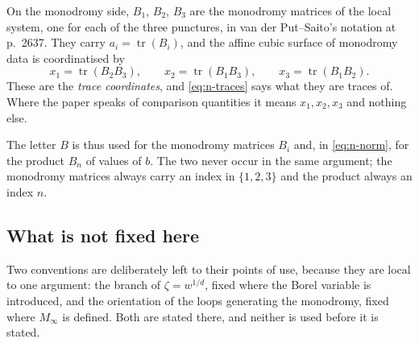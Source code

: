 On the monodromy side, $B_1$, $B_2$, $B_3$ are the monodromy matrices of the
local system, one for each of the three punctures, in van der Put--Saito's
notation at p.~2637. They carry $a_i=\operatorname{tr}(B_i)$, and the affine
cubic surface of monodromy data is coordinatised by
\begin{equation}\label{eq:n-traces}
  x_1=\operatorname{tr}(B_2B_3),\qquad
  x_2=\operatorname{tr}(B_1B_3),\qquad
  x_3=\operatorname{tr}(B_1B_2).
\end{equation}
These are the \emph{trace coordinates}, and \eqref{eq:n-traces} says what they
are traces of. Where the paper speaks of comparison quantities it means
$x_1,x_2,x_3$ and nothing else.

The letter $B$ is thus used for the monodromy matrices $B_i$ and, in
\eqref{eq:n-norm}, for the product $B_n$ of values of $b$. The two never occur
in the same argument; the monodromy matrices always carry an index in
$\{1,2,3\}$ and the product always an index $n$.

\subsection{What is not fixed here}\label{ssec:notfixed}

Two conventions are deliberately left to their points of use, because they are
local to one argument: the branch of $\zeta=w^{1/d}$, fixed where the Borel
variable is introduced, and the orientation of the loops generating the
monodromy, fixed where $M_\infty$ is defined. Both are stated there, and
neither is used before it is stated.
